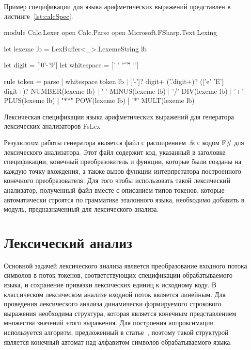 \documentclass[10pt, conference, compsocconf]{IEEEtran}
\begin{document}
Пример спецификации для языка арифметических выражений представлен в листинге~\ref{lst:calcSpec}.

\begin{listing}[h]
\begin{pyglist}[language=ocaml,numbers=none,numbersep=5pt]
{
module Calc.Lexer
open Calc.Parse 
open Microsoft.FSharp.Text.Lexing

let lexeme lb = LexBuffer<_>.LexemeString lb
}

let digit = ['0'-'9']
let whitespace = [' ' '\t' '\r' '\n']

rule token = parse
| whitespace { token lb }
| ['-']? digit+ ('.'digit+)? (['e' 'E'] digit+)?
       { NUMBER(lexeme lb) }
| '-'  { MINUS(lexeme lb) }
| '/'  { DIV(lexeme lb) }
| '+'  { PLUS(lexeme lb) }
| "**" { POW(lexeme lb) }
| '*'  { MULT(lexeme lb) }

\end{pyglist}
\caption{Лексическая спецификация языка арифметических выражений для генератора лексических анализаторов FsLex}
\label{lst:calcSpec}
\end{listing}

Результатом работы генератора является файл с расширением .fs с кодом F\# для лексического анализатора. Этот файл содержит код, указанный в заголовке спецификации, конечный преобразователь и функции, которые были созданы на каждую точку вхождения, а также вызов функции интерпретатора построенного конечного преобразователя. Для того чтобы использовать такой лексический анализатор, полученный файл вместе с описанием типов токенов, которые автоматически строятся по грамматике эталонного языка, необходимо добавить в модуль, предназначенный для лексического анализа. 


\section{Лексический анализ}
Основной задачей лексического анализа является преобразование входного потока символов в поток токенов, соответствующих спецификации обрабатываемого языка, и сохранение привязки лексических единиц к исходному коду. В классическом лексическом анализе входной поток является линейным. Для проведения лексического анализа динамически формируемого строкового выражения необходима структура, которая является  конечным представлением множества значений этого выражения. Для построения аппроксимации используется алгоритм, предложенный в статье~\cite{AlgoFangYu}, поэтому такой структурой является конечный автомат над алфавитом символов обрабатываемого языка. 
\end{document}
